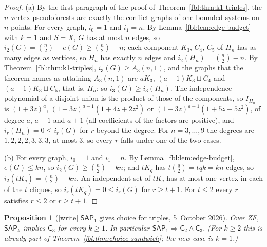 \documentclass[11pt]{article}
\newtheorem{proposition}[theorem]{Proposition}
\theoremstyle{definition}
\theoremstyle{remark}
\newcommand{\SAP}{\mathsf{SAP}}
\newcommand{\Cm}{\mathsf{C}}
\begin{document}
\begin{proof}
(a) By the first paragraph of the proof of
Theorem~\ref{fbl:thm:k1-triples}, the $n$-vertex pseudoforests are exactly
the conflict graphs of one-bounded systems on $n$ points. For every graph,
$i_0=1$ and $i_1=n$. By Lemma~\ref{fbl:lem:edge-budget} with $k=1$ and
$S=X$, $G$ has at most $n$ edges, so $i_2(G)=\binom n2-e(G)\ge\binom n2-n$;
each component $K_3$, $C_4$, $C_5$ of $H_n$ has as many edges as vertices,
so $H_n$ has exactly $n$ edges and $i_2(H_n)=\binom n2-n$. By
Theorem~\ref{fbl:thm:k1-triples}, $i_3(G)\ge A_3(n,1)$, and the graphs that
the theorem names as attaining $A_3(n,1)$ are $aK_3$, $(a-1)K_3\sqcup C_4$
and $(a-1)K_3\sqcup C_5$, that is, $H_n$; so $i_3(G)\ge i_3(H_n)$. The
independence polynomial of a disjoint union is the product of those of the
components, so $I_{H_n}$ is $(1+3z)^a$, $(1+3z)^{a-1}(1+4z+2z^2)$ or
$(1+3z)^{a-1}(1+5z+5z^2)$, of degree $a$, $a+1$ and $a+1$ (all coefficients
of the factors are positive), and $i_r(H_n)=0\le i_r(G)$ for $r$ beyond
the degree. For $n=3,\dots,9$ the degrees are $1,2,2,2,3,3,3$, at most
$3$, so every $r$ falls under one of the two cases.

(b) For every graph, $i_0=1$ and $i_1=n$. By
Lemma~\ref{fbl:lem:edge-budget}, $e(G)\le kn$, so $i_2(G)\ge\binom n2-kn$;
and $tK_q$ has $t\binom q2=tqk=kn$ edges, so $i_2(tK_q)=\binom n2-kn$. An
independent set of $tK_q$ has at most one vertex in each of the $t$
cliques, so $i_r(tK_q)=0\le i_r(G)$ for $r\ge t+1$. For $t\le2$ every
$r$ satisfies $r\le2$ or $r\ge t+1$.
\end{proof}

\begin{proposition}[{[write]} $\SAP_1$ gives choice for triples, 5~October 2026]
\label{fbl:prop:three}
Over ZF, $\SAP_k$ implies $\Cm_3$ for every $k\ge1$. In particular
$\SAP_1\Rightarrow\Cm_2\wedge\Cm_3$. (For $k\ge2$ this is already part of
Theorem~\ref{fbl:thm:choice-sandwich}; the new case is $k=1$.)
\end{proposition}
\end{document}
